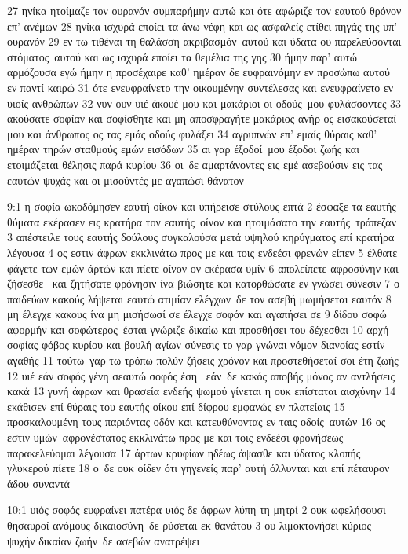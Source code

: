 \documentclass[10pt,oneside,footinclude=true,headinclude=true]{scrbook} %
\begin{document}
27 ηνίκα ητοίμαζε τον ουρανόν συμπαρήμην αυτώ και ότε αφώριζε τον εαυτού θρόνον επ' ανέμων
28 ηνίκα ισχυρά εποίει τα άνω νέφη και ως ασφαλείς ετίθει πηγάς της υπ' ουρανόν
29 εν τω τιθέναι τη θαλάσση ακριβασμόν αυτού και ύδατα ου παρελεύσονται στόματος αυτού και ως ισχυρά εποίει τα θεμέλια της γης
30 ήμην παρ' αυτώ αρμόζουσα εγώ ήμην η προσέχαιρε καθ' ημέραν δε ευφραινόμην εν προσώπω αυτού εν παντί καιρώ
31 ότε ενευφραίνετο την οικουμένην συντέλεσας και ενευφραίνετο εν υιοίς ανθρώπων
32 νυν ουν υιέ άκουέ μου και μακάριοι οι οδούς μου φυλάσσοντες
33 ακούσατε σοφίαν και σοφίσθητε και μη αποσφραγήτε μακάριος ανήρ ος εισακούσεταί μου και άνθρωπος ος τας εμάς οδούς φυλάξει
34 αγρυπνών επ' εμαίς θύραις καθ' ημέραν τηρών σταθμούς εμών εισόδων
35 αι γαρ έξοδοί μου έξοδοι ζωής και ετοιμάζεται θέλησις παρά κυρίου
36 οι δε αμαρτάνοντες εις εμέ ασεβούσιν εις τας εαυτών ψυχάς και οι μισούντές με αγαπώσι θάνατον
\par
9:1 η σοφία ωκοδόμησεν εαυτή οίκον και υπήρεισε στύλους επτά
2 έσφαξε τα εαυτής θύματα εκέρασεν εις κρατήρα τον εαυτής οίνον και ητοιμάσατο την εαυτής τράπεζαν
3 απέστειλε τους εαυτής δούλους συγκαλούσα μετά υψηλού κηρύγματος επί κρατήρα λέγουσα
4 ος εστιν άφρων εκκλινάτω προς με και τοις ενδεέσι φρενών είπεν
5 έλθατε φάγετε των εμών άρτών και πίετε οίνον ον εκέρασα υμίν
6 απολείπετε αφροσύνην και ζήσεσθε  και ζητήσατε φρόνησιν ίνα βιώσητε και κατορθώσατε εν γνώσει σύνεσιν
7 ο παιδεύων κακούς λήψεται εαυτώ ατιμίαν ελέγχων δε τον ασεβή μωμήσεται εαυτόν
8 μη έλεγχε κακους ίνα μη μισήσωσί σε έλεγχε σοφόν και αγαπήσει σε
9 δίδου σοφώ αφορμήν και σοφώτερος έσται γνώριζε δικαίω και προσθήσει του δέχεσθαι
10 αρχή σοφίας φόβος κυρίου και βουλή αγίων σύνεσις το γαρ γνώναι νόμον διανοίας εστίν αγαθής
11 τούτω γαρ τω τρόπω πολύν ζήσεις χρόνον και προστεθήσεταί σοι έτη ζωής
12 υιέ εάν σοφός γένη σεαυτώ σοφός έση  εάν δε κακός αποβής μόνος αν αντλήσεις κακά
13 γυνή άφρων και θρασεία ενδεής ψωμού γίνεται η ουκ επίσταται αισχύνην
14 εκάθισεν επί θύραις του εαυτής οίκου επί δίφρου εμφανώς εν πλατείαις
15 προσκαλουμένη τους παριόντας οδόν και κατευθύνοντας εν ταις οδοίς αυτών
16 ος εστιν υμών αφρονέστατος εκκλινάτω προς με και τοις ενδεέσι φρονήσεως παρακελεύομαι λέγουσα
17 άρτων κρυφίων ηδέως άψασθε και ύδατος κλοπής γλυκερού πίετε
18 ο δε ουκ οίδεν ότι γηγενείς παρ' αυτή όλλυνται και επί πέταυρον άδου συναντά
\par
10:1 υιός σοφός ευφραίνει πατέρα υιός δε άφρων λύπη τη μητρί
2 ουκ ωφελήσουσι θησαυροί ανόμους δικαιοσύνη δε ρύσεται εκ θανάτου
3 ου λιμοκτονήσει κύριος ψυχήν δικαίαν ζωήν δε ασεβών ανατρέψει
\end{document}
